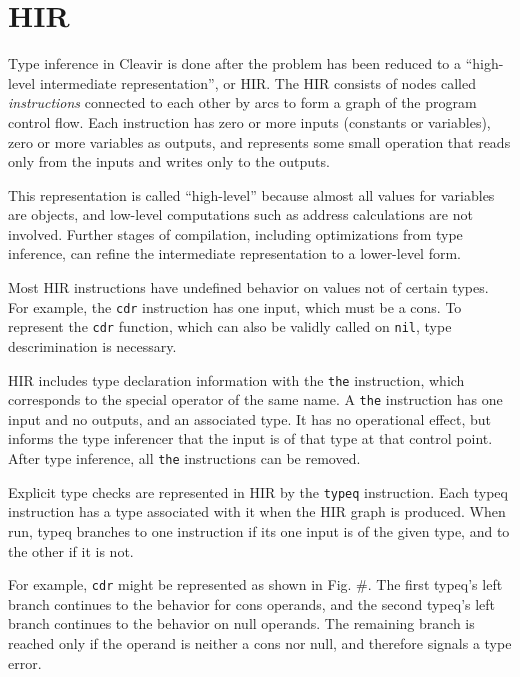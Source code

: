 \section{HIR}

Type inference in Cleavir is done after the problem has been reduced to a ``high-level intermediate representation'', or HIR. The HIR consists of nodes called \textit{instructions} connected to each other by arcs to form a graph of the program control flow. Each instruction has zero or more inputs (constants or variables), zero or more variables as outputs, and represents some small operation that reads only from the inputs and writes only to the outputs.

This representation is called ``high-level'' because almost all values for variables are \commonlisp{} objects, and low-level computations such as address calculations are not involved. Further stages of compilation, including optimizations from type inference, can refine the intermediate representation to a lower-level form.

Most HIR instructions have undefined behavior on values not of certain types. For example, the \texttt{cdr} instruction has one input, which must be a cons. To represent the \commonlisp{} \texttt{cdr} function, which can also be validly called on \texttt{nil}, type descrimination is necessary.

HIR includes type declaration information with the \texttt{the} instruction, which corresponds to the \commonlisp{} special operator of the same name. A \texttt{the} instruction has one input and no outputs, and an associated type. It has no operational effect, but informs the type inferencer that the input is of that type at that control point. After type inference, all \texttt{the} instructions can be removed.

Explicit type checks are represented in HIR by the \texttt{typeq} instruction. Each typeq instruction has a type associated with it when the HIR graph is produced. When run, typeq branches to one instruction if its one input is of the given type, and to the other if it is not.

For example, \texttt{cdr} might be represented as shown in Fig. #. The first typeq's left branch continues to the behavior for cons operands, and the second typeq's left branch continues to the behavior on null operands. The remaining branch is reached only if the operand is neither a cons nor null, and therefore signals a type error.
